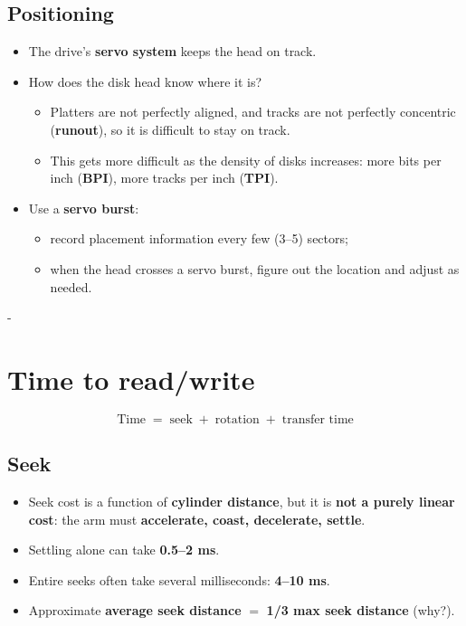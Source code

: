 \documentclass[11pt,a4paper]{article}
\makeatletter
\newcommand{\keepspace}[1]{\par\penalty-100\begingroup
  \setlength{\dimen@}{#1}\dimen@ii\pagegoal\advance\dimen@ii-\pagetotal
  \ifdim\dimen@>\dimen@ii\ifdim\dimen@ii>\z@\vfil\fi\break\fi\endgroup}
\makeatother
\begin{document}
\subsection{Positioning}

\begin{itemize}
  \item The drive's \textbf{servo system} keeps the head on track.
  \item How does the disk head know where it is?
    \begin{itemize}
      \item Platters are not perfectly aligned, and tracks are not perfectly
            concentric (\textbf{runout}), so it is difficult to stay on track.
      \item This gets more difficult as the density of disks increases: more
            bits per inch (\textbf{BPI}), more tracks per inch (\textbf{TPI}).
    \end{itemize}
  \item Use a \textbf{servo burst}:
    \begin{itemize}
      \item record placement information every few (3--5) sectors;
      \item when the head crosses a servo burst, figure out the location and
            adjust as needed.
    \end{itemize}
\end{itemize}

\keepspace{12\baselineskip}
\section{Time to read/write}

\begin{keybox}
\[
  \text{Time} \;=\; \text{seek} \;+\; \text{rotation} \;+\; \text{transfer time}
\]
\end{keybox}

\subsection{Seek}

\begin{itemize}
  \item Seek cost is a function of \textbf{cylinder distance}, but it is
        \textbf{not a purely linear cost}: the arm must
        \textbf{accelerate, coast, decelerate, settle}.
  \item Settling alone can take \textbf{0.5--2 ms}.
  \item Entire seeks often take several milliseconds: \textbf{4--10 ms}.
  \item Approximate \textbf{average seek distance} \(=\) \textbf{1/3 max seek
        distance} (why?).
\end{itemize}
\end{document}
